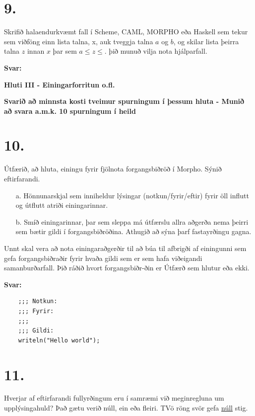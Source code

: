 \documentclass{article}
\newcommand{\sv}{\textbf{Svar:}}
\newcommand{\bo}[1]{\textbf{#1}}
\begin{document}
     \newpage
     \section{9.}
     Skrifið halaendurkvæmt fall í Scheme, CAML, MORPHO eða Haskell
     sem tekur sem viðföng einn lista talna, x, auk tveggja talna $a$ og $b$,
     og skilar lista þeirra talna $z$ innan $x$ þar sem $a \leq z \leq$. þið munuð 
     vilja nota hjálparfall.


     \sv 




     \newpage

     \begin{center}
     \bo{Hluti III - Einingarforritun o.fl.}

     \bo{Svarið að minnsta kosti tveimur spurningum í þessum hluta - Munið að svara a.m.k. 10 spurningum í heild}
     \end{center}


     \section{10.}
     Útfærið, að hluta, einingu fyrir fjölnota forgangsbiðröð í Morpho.
     Sýnið eftirfarandi.
     \begin{itemize}
        \item[a.] Hönnunarskjal sem inniheldur lýsingar (notkun/fyrir/eftir) fyrir
                  öll influtt og útflutt atriði einingarinnar.
        \item[b.] Smíð einingarinnar, þar sem sleppa má útfærslu allra 
                  aðgerða nema þeirri sem bætir gildi í forgangsbiðröðina.
                  Athugið að sýna þarf fastayrðingu gagna.
                  
     \end{itemize}
     Unnt skal vera að nota einingaraðgerðir til að búa til afbrigði af 
     einingunni sem gefa forgangsbiðraðir fyrir hvaða gildi sem er sem
     hafa viðeigandi samanburðarfall. Þið ráðið hvort forgangsbiðr-ðin er
     Útfærð sem hlutur eða ekki.

     \sv





    \begin{lstlisting}
    ;;; Notkun:
    ;;; Fyrir:
    ;;;
    ;;; Gildi:
    writeln("Hello world");  
    \end{lstlisting}


    \newpage
    \section{11.}
    Hverjar af eftirfarandi fullyrðingum eru í samræmi við meginregluna um upplýsingahuld? 
    Það gætu verið núll, ein eða fleiri. TVö röng svör gefa \underline{núll} stig.
\end{document}
